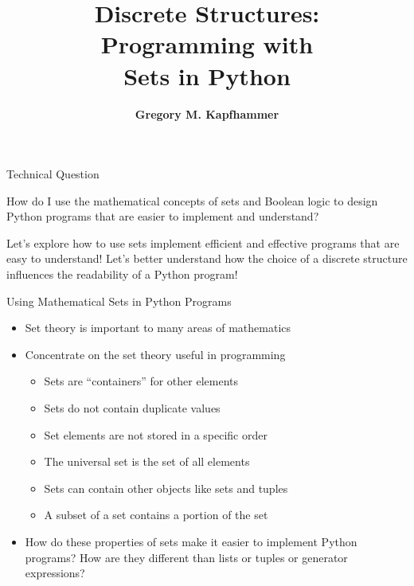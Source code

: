 \documentclass[14pt,aspectratio=169]{beamer}
\title{Discrete Structures: \\ Programming with \\ Sets in Python}
\author{{\bf Gregory M. Kapfhammer}}
\institute[shortinst]{{\bf Department of Computer Science, Allegheny College}}
\begin{document}
{
  \begin{frame}
    \titlepage
  \end{frame}
}

%
\begin{frame}{Technical Question}
  \hspace*{.5in}
  \begin{minipage}{4.3in}
    \vspace*{.1in}
    \begin{center}
      {\large How do I use the mathematical concepts of sets and Boolean logic
      to design Python programs that are easier to implement and understand?}
    \end{center}
  \end{minipage}
  \vspace{2ex}
  \begin{center}
    \small Let's explore how to use sets implement efficient and effective
    programs that are easy to understand! Let's better understand how the choice
    of a discrete structure influences the readability of a Python program!
  \end{center}
\end{frame}

%
\begin{frame}{Using Mathematical Sets in Python Programs}
  \begin{itemize}
    \item Set theory is important to many areas of mathematics
      \vspace*{-.15in}
    \item Concentrate on the set theory useful in programming
      \begin{itemize}
        \item Sets are ``containers'' for other elements
        \item Sets do not contain duplicate values
        \item Set elements are not stored in a specific order
        \item The universal set is the set of all elements
        \item Sets can contain other objects like sets and tuples
        \item A subset of a set contains a portion of the set
      \end{itemize}
      \vspace*{-.2in}
    \item How do these properties of sets make it easier to implement Python
      programs? How are they different than lists or tuples or generator
      expressions?
  \end{itemize}
\end{frame}
\end{document}
